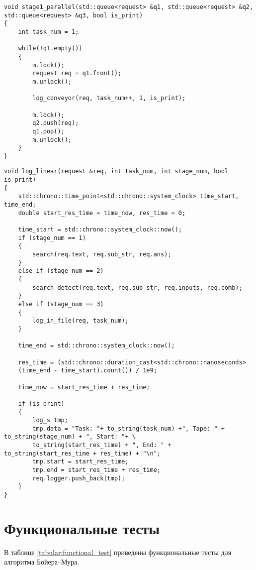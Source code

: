 \newpage
\begin{lstlisting}[label=lst:thread,caption= Лента параллельного конвейера]
void stage1_parallel(std::queue<request> &q1, std::queue<request> &q2, std::queue<request> &q3, bool is_print)
{
	int task_num = 1;
	
	while(!q1.empty())
	{      
		m.lock();
		request req = q1.front();
		m.unlock();
		
		log_conveyor(req, task_num++, 1, is_print);
		
		m.lock();
		q2.push(req);
		q1.pop();
		m.unlock();
	}
}
\end{lstlisting}
\newpage
\begin{lstlisting}[label=lst:thread2,caption= Лента последовательного конвейера]
void log_linear(request &req, int task_num, int stage_num, bool is_print)
{
	std::chrono::time_point<std::chrono::system_clock> time_start, time_end;
	double start_res_time = time_now, res_time = 0;
	
	time_start = std::chrono::system_clock::now();
	if (stage_num == 1)
	{
		search(req.text, req.sub_str, req.ans);
	}
	else if (stage_num == 2)
	{
		search_detect(req.text, req.sub_str, req.inputs, req.comb);
	}
	else if (stage_num == 3)
	{
		log_in_file(req, task_num);
	}
	
	time_end = std::chrono::system_clock::now();
	
	res_time = (std::chrono::duration_cast<std::chrono::nanoseconds>
	(time_end - time_start).count()) / 1e9;
	
	time_now = start_res_time + res_time;
	
	if (is_print)
	{
		log_s tmp;
		tmp.data = "Task: "+ to_string(task_num) +", Tape: " + to_string(stage_num) + ", Start: "+ \
		to_string(start_res_time) + ", End: " + to_string(start_res_time + res_time) + "\n";
		tmp.start = start_res_time;
		tmp.end = start_res_time + res_time;
		req.logger.push_back(tmp);
	}
}
\end{lstlisting}
\section{Функциональные тесты}
В таблице \ref{tabular:functional_test} приведены функциональные тесты для алгоритма Бойера--Мура.

